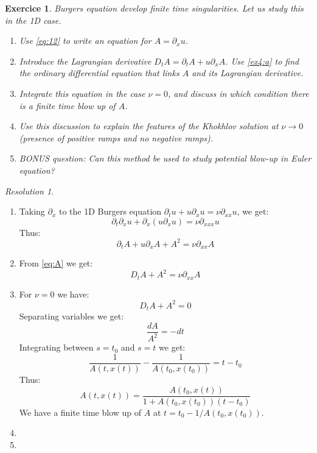 \documentclass[10pt,a4paper]{article}
\newtheorem{exercici}{Exercice}
\theoremstyle{remark}
\newtheorem*{res}{Resolution}
\begin{document}
\begin{exercici}
  Burgers equation develop finite time singularities. Let us study this in the 1D case.
  \begin{enumerate}
    \item\label{ex4:a} Use \eqref{eq:12} to write an equation for $A = \partial_x u$.
    \item Introduce the Lagrangian derivative $D_t A = \partial_t A + u\partial_x A$. Use \ref{ex4:a} to find the ordinary differential equation that links $A$ and its Lagrangian derivative.
    \item Integrate this equation in the case $\nu = 0$, and discuss in which condition there is a finite time blow up of $A$.
    \item Use this discussion to explain the features of the Khokhlov solution at $\nu \to 0$ (presence of positive ramps and no negative ramps).
    \item BONUS question: Can this method be used to study potential blow-up in Euler equation?
  \end{enumerate}
\end{exercici}
\begin{res}\hfill
  \begin{enumerate}
    \item Taking $\partial_x$ to the 1D Burgers equation $\partial_t u + u\partial_x u = \nu \partial_{xx} u$, we get:
          \begin{equation*}
            \partial_t \partial_x u + \partial_x(u\partial_x u) = \nu \partial_{xxx} u
          \end{equation*}
          Thus:
          \begin{equation}\label{eq:A}
            \partial_t A + u\partial_x A + A^2 = \nu \partial_{xx} A
          \end{equation}
    \item From \cref{eq:A} we get:
          \begin{equation*}
            D_t A + A^2 = \nu \partial_{xx} A
          \end{equation*}
    \item For $\nu=0$ we have:
          \begin{equation*}
            D_t A + A^2 = 0
          \end{equation*}
          Separating variables we get:
          \begin{equation*}
            \frac{dA}{A^2} = -dt
          \end{equation*}
          Integrating between $s=t_0$ and $s=t$ we get:
          \begin{equation*}
            \frac{1}{A(t,x(t))} - \frac{1}{A(t_0,x(t_0))} = t-t_0
          \end{equation*}
          Thus:
          \begin{equation*}
            A(t,x(t)) = \frac{A(t_0,x(t))}{1+A(t_0,x(t_0))(t-t_0)}
          \end{equation*}
          We have a finite time blow up of $A$ at $t=t_0-1/A(t_0,x(t_0))$.
    \item
    \item
  \end{enumerate}
\end{res}
\end{document}
